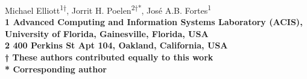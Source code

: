 \begin{flushleft}

{\Large
 \textbf{}
 }
 \newline
Michael Elliott\textsuperscript{1}\textsuperscript{†},
Jorrit H. Poelen\textsuperscript{2}\textsuperscript{†}\textsuperscript{*},
José A.B. Fortes\textsuperscript{1}
\bigskip
\\
\bf{1} Advanced Computing and Information Systems Laboratory (ACIS), University of Florida, Gainesville, Florida, USA
\\
\bf{2} 400 Perkins St Apt 104, Oakland, California, USA
\\
\bf{†} These authors contributed equally to this work
\\
\bf{*} Corresponding author
\bigskip


\end{flushleft}

